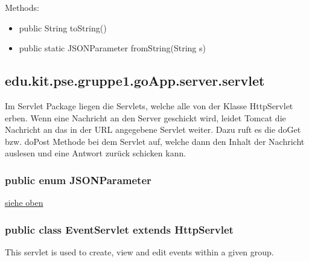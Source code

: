 Methods:
\begin{itemize}
	\item public String toString()
		
	\item public static JSONParameter fromString(String s)
\end{itemize}

\hypertarget{Servlets}{}
	\subsection{edu.kit.pse.gruppe1.goApp.server.servlet}
	Im Servlet Package liegen die Servlets, welche alle von der Klasse HttpServlet erben.
	Wenn eine Nachricht an den Server geschickt wird, leidet Tomcat die Nachricht an das in der URL angegebene Servlet weiter.
	Dazu ruft es die doGet bzw. doPost Methode bei dem Servlet auf, welche dann den Inhalt der Nachricht auslesen und eine Antwort zurück schicken kann.
	\subsubsection{public enum JSONParameter}
	\hyperlink{JSONParameter}{siehe oben}
\subsubsection{public class EventServlet extends HttpServlet}
This servlet is used to create, view and edit events within a given group.

